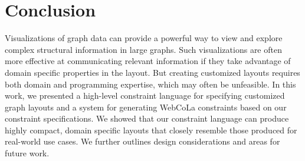 \section{Conclusion}
Visualizations of graph data can provide a powerful way to view and explore complex structural information in large graphs. Such visualizations are often more effective at communicating relevant information if they take advantage of domain specific properties in the layout. But creating customized layouts requires both domain and programming expertise, which may often be unfeasible. In this work, we presented a high-level constraint language for specifying customized graph layouts and a system for generating WebCoLa constraints based on our constraint specifications. We showed that our constraint language can produce highly compact, domain specific layouts that closely resemble those produced for real-world use cases. We further outlines design considerations and areas for future work.